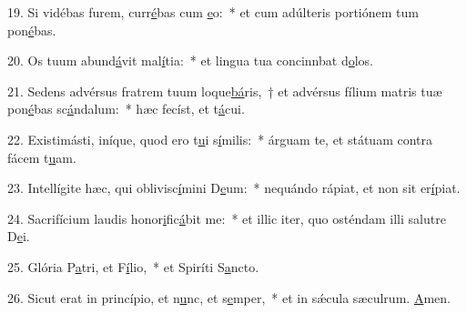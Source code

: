 19. Si vidébas furem, curr\uline{é}bas cum \uline{e}o:~* et cum adúlteris portiónem tum pon\uline{é}bas.\par 
20. Os tuum abund\uline{á}vit mal\uline{í}tia:~* et lingua tua concinnbat d\uline{o}los.\par 
21. Sedens advérsus fratrem tuum loque\uline{bá}ris,~† et advérsus fílium matris tuæ pon\uline{é}bas sc\uline{á}ndalum:~* hæc fecíst, et t\uline{á}cui.\par 
22. Existimásti, iníque, quod ero t\uline{u}i s\uline{í}milis:~* árguam te, et státuam contra fácem t\uline{u}am.\par 
23. Intellígite hæc, qui oblivisc\uline{í}mini D\uline{e}um:~* nequándo rápiat, et non sit  er\uline{í}piat.\par 
24. Sacrifícium laudis honor\uline{i}fic\uline{á}bit me:~* et illic iter, quo osténdam illi salutre D\uline{e}i.\par 
25. Glória P\uline{a}tri, et F\uline{í}lio,~* et Spiríti S\uline{a}ncto.\par 
26. Sicut erat in princípio, et n\uline{u}nc, et s\uline{e}mper,~* et in sǽcula sæculrum. \uline{A}men.\par 

